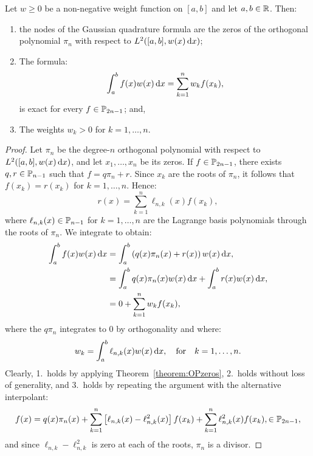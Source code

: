 \begin{theorem}\label{theorem:Gaussnodesandweights}
Let $w\ge0$ be a non-negative weight function on $[a,b]$ and let $a,b\in\R$. Then:
\begin{enumerate}
\item the nodes of the Gaussian quadrature formula are the zeros of the orthogonal polynomial $\pi_n$ with respect to $L^2([a,b],w(x)\ud x)$;
\item The formula:
\[
\int_a^bf(x)w(x)\ud x = \sum_{k=1}^n w_kf(x_k),
\]
is exact for every $f\in\P_{2n-1}$; and,
\item The weights $w_k>0$ for $k=1,\ldots,n$.
\end{enumerate}
\end{theorem}
\begin{proof}
Let $\pi_n$ be the degree-$n$ orthogonal polynomial with respect to $L^2([a,b],w(x)\ud x)$, and let $x_1,\ldots,x_n$ be its zeros. If $f\in\P_{2n-1}$, there exists $q,r\in\P_{n-1}$ such that $f = q\pi_n + r$. Since $x_k$ are the roots of $\pi_n$, it follows that $f(x_k) = r(x_k)$ for $k=1,\ldots,n$. Hence:
\[
r(x) = \sum_{k=1}^n \ell_{n,k}(x) f(x_k),
\]
where $\ell_{n,k}(x)\in\P_{n-1}$ for $k=1,\ldots,n$ are the Lagrange basis polynomials through the roots of $\pi_n$. We integrate to obtain:
\begin{align*}
\int_a^b f(x)w(x)\ud x & = \int_a^b\left(q(x)\pi_n(x)+r(x)\right)w(x)\ud x,\\
& = \int_a^b q(x)\pi_n(x)w(x)\ud x + \int_a^br(x) w(x)\ud x,\\
& = 0 + \sum_{k=1}^nw_kf(x_k),
\end{align*}
where the $q\pi_n$ integrates to $0$ by orthogonality and where:
\[
w_k = \int_a^b \ell_{n,k}(x)w(x)\ud x,\quad{\rm for}\quad k=1,\ldots,n.
\]
Clearly, 1.~holds by applying Theorem~\ref{theorem:OPzeros}, 2.~holds without loss of generality, and 3.~holds by repeating the argument with the alternative interpolant:
\[
f(x) = q(x)\pi_n(x) + \sum_{k=1}^n\left[\ell_{n,k}(x)-\ell_{n,k}^2(x)\right]f(x_k) + \sum_{k=1}^n\ell_{n,k}^2(x)f(x_k),\in\P_{2n-1},
\]
and since $\ell_{n,k}-\ell_{n,k}^2$ is zero at each of the roots, $\pi_n$ is a divisor.
\end{proof}

